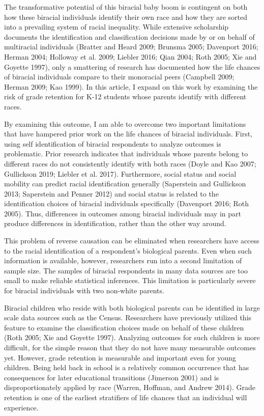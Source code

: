 \documentclass[
  letterpaper,
  DIV=11,
  numbers=noendperiod]{scrartcl}
\begin{document}
The transformative potential of this biracial baby boom is contingent on
both how these biracial individuals identify their own race and how they
are sorted into a prevailing system of racial inequality. While
extensive scholarship documents the identification and classification
decisions made by or on behalf of multiracial individuals (Bratter and
Heard 2009; Brunsma 2005; Davenport 2016; Herman 2004; Holloway et al.
2009; Liebler 2016; Qian 2004; Roth 2005; Xie and Goyette 1997), only a
smattering of research has documented how the life chances of biracial
individuals compare to their monoracial peers (Campbell 2009; Herman
2009; Kao 1999). In this article, I expand on this work by examining the
risk of grade retention for K-12 students whose parents identify with
different races.

By examining this outcome, I am able to overcome two important
limitations that have hampered prior work on the life chances of
biracial individuals. First, using self identification of biracial
respondents to analyze outcomes is problematic. Prior research indicates
that individuals whose parents belong to different races do not
consistently identify with both races (Doyle and Kao 2007; Gullickson
2019; Liebler et al. 2017). Furthermore, social status and social
mobility can predict racial identification generally (Saperstein and
Gullickson 2013; Saperstein and Penner 2012) and social status is
related to the identification choices of biracial individuals
specifically (Davenport 2016; Roth 2005). Thus, differences in outcomes
among biracial individuals may in part produce differences in
identification, rather than the other way around.

This problem of reverse causation can be eliminated when researchers
have access to the racial identification of a respondent's biological
parents. Even when such information is available, however, researchers
run into a second limitation of sample size. The samples of biracial
respondents in many data sources are too small to make reliable
statistical inferences. This limitation is particularly severe for
biracial individuals with two non-white parents.

Biracial children who reside with both biological parents can be
identified in large scale data sources such as the Census. Researchers
have previously utilized this feature to examine the classification
choices made on behalf of these children (Roth 2005; Xie and Goyette
1997). Analyzing outcomes for such children is more difficult, for the
simple reason that they do not have many measurable outcomes yet.
However, grade retention is measurable and important even for young
children. Being held back in school is a relatively common occurrence
that has consequences for later educational transitions (Jimerson 2001)
and is disproportionately applied by race (Warren, Hoffman, and Andrew
2014). Grade retention is one of the earliest stratifiers of life
chances that an individual will experience.
\end{document}
